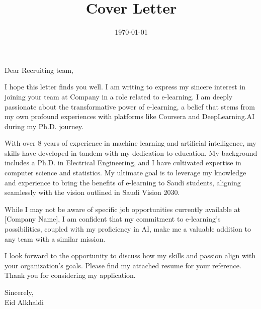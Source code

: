 \documentclass[11pt]{article}
\date{\today}
\title{Cover Letter}
\begin{document}
\maketitle
\noindent
Dear Recruiting team,
\indent

I hope this letter finds you well. I am writing to express my sincere interest in joining your team at Company in a role related to e-learning. I am deeply passionate about the transformative power of e-learning, a belief that stems from my own profound experiences with platforms like Coursera and DeepLearning.AI during my Ph.D. journey.

With over 8 years of experience in machine learning and artificial intelligence, my skills have developed in tandem with my dedication to education. My background includes a Ph.D. in Electrical Engineering, and I have cultivated expertise in computer science and statistics. My ultimate goal is to leverage my knowledge and experience to bring the benefits of e-learning to Saudi students, aligning seamlessly with the vision outlined in Saudi Vision 2030.

While I may not be aware of specific job opportunities currently available at [Company Name], I am confident that my commitment to e-learning's possibilities, coupled with my proficiency in AI, make me a valuable addition to any team with a similar mission.

I look forward to the opportunity to discuss how my skills and passion align with your organization's goals. Please find my attached resume for your reference. Thank you for considering my application.


\noindent
Sincerely,\\[0pt]
Eid Alkhaldi
\end{document}
